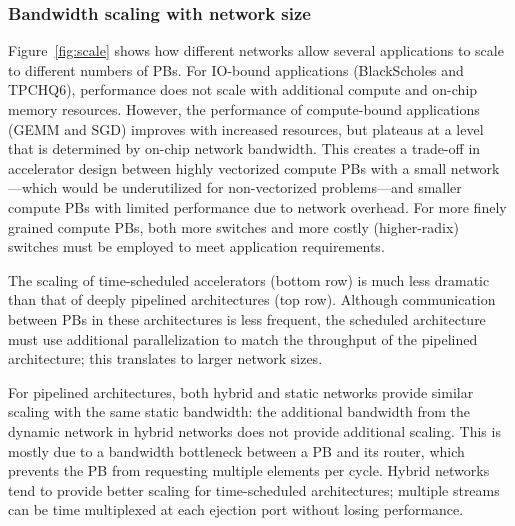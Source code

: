 \subsubsection{Bandwidth scaling with network size}\label{sec:scale}
Figure~\ref{fig:scale} shows how different networks allow several applications to scale to different numbers of PBs.
For IO-bound applications (BlackScholes and TPCHQ6), performance does not scale with additional compute and on-chip memory resources.
However, the performance of compute-bound applications (GEMM and SGD) improves with increased resources, but plateaus at a level that is determined by on-chip network bandwidth. 
This creates a trade-off in accelerator design between highly vectorized compute PBs with a small network---which would be underutilized for non-vectorized problems---and smaller compute PBs with limited performance due to network overhead. 
For more finely grained compute PBs, both more switches and more costly (higher-radix) switches must be employed to meet application requirements.

The scaling of time-scheduled accelerators (bottom row) is much less dramatic than that of deeply pipelined architectures (top row). 
Although communication between PBs in these architectures is less frequent, the scheduled architecture must use additional parallelization to match the throughput of the pipelined architecture; this translates to larger network sizes. 

For pipelined architectures, both hybrid and static networks provide similar scaling with the same static bandwidth:
the additional bandwidth from the dynamic network in hybrid networks does not provide additional scaling. 
This is mostly due to a bandwidth bottleneck between a PB and its router, which prevents the PB from requesting multiple elements per cycle.
Hybrid networks tend to provide better scaling for time-scheduled architectures; multiple streams can be time multiplexed at each ejection port without losing performance.

